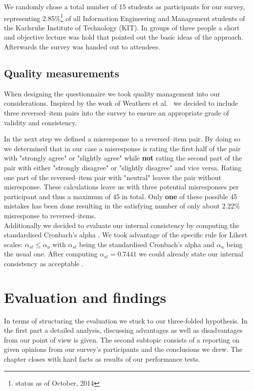 \documentclass[runningheads]{llncs}
\begin{document}
We randomly chose a total number of 15 students as participants for our survey, representing 2.85\%\footnote{status as of October, 2014} of all Information Engineering and Management students of the Karlsruhe Institute of Technology (KIT). In groups of three people a short and objective lecture was hold that pointed out the basic ideas of the approach. Afterwards the survey was handed out to attendees.

\subsection{Quality measurements}

When designing the questionnaire we took quality management into our considerations.
Inspired by the work of Weathers et al.~\cite{SwWN08} we decided to include three reversed--item pairs into the survey to ensure an appropriate grade of validity and consistency.

In the next step we defined a misresponse to a reversed--item pair. By doing so we determined that in our case a misresponse is rating the first half of the pair with "strongly agree" or "slightly agree" while \textbf{not} rating the second part of the pair with either "strongly disagree" or "slightly disagree" and vice versa. Rating one part of the reversed--item pair with "neutral" leaves the pair without misresponse. These calculations leave us with three potential misresponses per participant and thus a maximum of 45 in total. Only \textbf{one} of these possible 45 mistakes has been done resulting in the satisfying number of only about 2.22\% misresponse to reversed--items. \\
Additionally we decided to evaluate our internal consistency by computing the standardised Cronbach's alpha \cite{TaDe11}. We took advantage of the specific rule for Likert scales: $\alpha_{st} \le \alpha_u$ with $\alpha_{st}$ being the standardised Cronbach's alpha and $\alpha_u$ being the usual one. After computing $\alpha_{st} = 0.7441$ we could already state our internal consistency as acceptable \cite{Geor03}.

\section{Evaluation and findings}\label{c5}
In terms of structuring the evaluation we stuck to our three-folded hypothesis.
In the first part a detailed analysis, discussing advantages as well as disadvantages from our point of view is given. The second subtopic consists of a reporting on given opinions from our survey's participants and the conclusions we drew.
The chapter closes with hard facts as results of our performance tests. 
\end{document}
